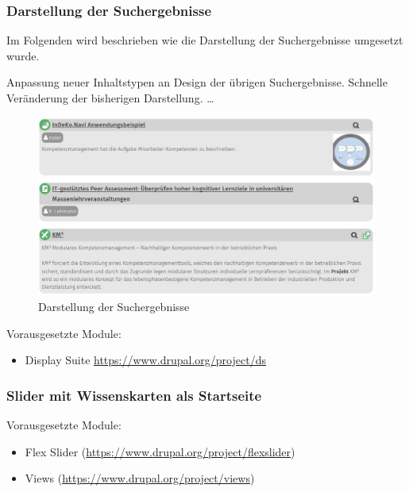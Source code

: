 \subsubsection{Darstellung der Suchergebnisse}\label{subsub:suchergebnisse}
Im Folgenden wird beschrieben wie die Darstellung der Suchergebnisse umgesetzt wurde.

Anpassung neuer Inhaltstypen an Design der übrigen Suchergebnisse. Schnelle Veränderung der bisherigen Darstellung. \dots


\begin{figure}[H]
	\centering
	\includegraphics[height=0.20\textheight]{images/example_searchresult}
	\caption{Darstellung der Suchergebnisse}
	\label{fig:example_searchresult}
\end{figure}


Vorausgesetzte Module:
\begin{itemize}
	\item Display Suite \url{https://www.drupal.org/project/ds}
\end{itemize}


\newpage
\subsubsection{Slider mit Wissenskarten als Startseite}\label{subsub:wkslider}
Vorausgesetzte Module:
\begin{itemize}
	\item Flex Slider (\url{https://www.drupal.org/project/flexslider})
	\item Views (\url{https://www.drupal.org/project/views})
\end{itemize}


